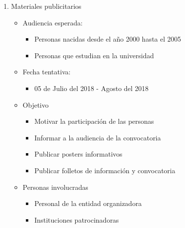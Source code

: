 \documentclass{article}
\begin{document}
\begin{enumerate}
\item Materiales publicitarios
\begin{itemize}
\item Audiencia esperada:
\begin{itemize}
\item Personas nacidas desde el año 2000 hasta el 2005
\item Personas que estudian en la universidad
\end{itemize}
\item Fecha tentativa:
\begin{itemize}
\item 05 de Julio del 2018 - Agosto del 2018
\end{itemize}
\item Objetivo
\begin{itemize}
\item Motivar la participación de las personas
\item Informar a la audiencia de la convocatoria
\item Publicar posters informativos
\item Publicar folletos de información y convocatoria
\end{itemize}
\item Personas involucradas
\begin{itemize}
\item Personal de la entidad organizadora 
\item Instituciones patrocinadoras
\end{itemize}
\end{itemize}



\end{enumerate}
\end{document}
